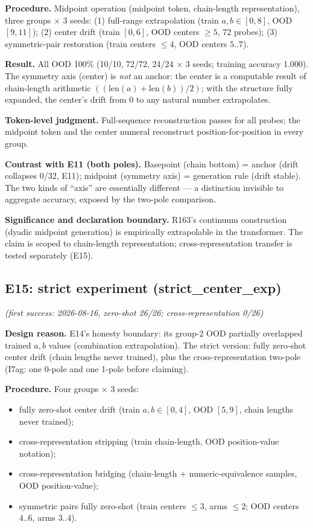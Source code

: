\documentclass[sigplan,10pt,anonymous,review]{acmart}
\begin{document}
\textbf{Procedure.} Midpoint operation (midpoint token, chain-length
representation), three groups $\times$ 3 seeds: (1) full-range
extrapolation (train $a,b\in[0,8]$, OOD $[9,11]$); (2) center drift (train
$[0,6]$, OOD centers $\ge 5$, 72 probes); (3) symmetric-pair restoration
(train centers $\le 4$, OOD centers $5..7$).

\textbf{Result.} All OOD 100\% (10/10, 72/72, 24/24 $\times$ 3 seeds;
training accuracy 1.000). The symmetry axis (center) is \emph{not} an
anchor: the center is a computable result of chain-length arithmetic
$((\mathrm{len}(a)+\mathrm{len}(b))/2)$; with the structure fully expanded,
the center's drift from 0 to any natural number extrapolates.

\textbf{Token-level judgment.} Full-sequence reconstruction passes for all
probes; the midpoint token and the center numeral reconstruct
position-for-position in every group.

\textbf{Contrast with E11 (both poles).} Basepoint (chain bottom) = anchor
(drift collapses 0/32, E11); midpoint (symmetry axis) = generation rule
(drift stable). The two kinds of ``axis'' are essentially different --- a
distinction invisible to aggregate accuracy, exposed by the two-pole
comparison.

\textbf{Significance and declaration boundary.} R163's continuum
construction (dyadic midpoint generation) is empirically extrapolable in
the transformer. The claim is scoped to chain-length representation;
cross-representation transfer is tested separately (E15).

\subsection{E15: strict experiment (strict\_center\_exp)}\hfill\textit{(first success: 2026-08-16, zero-shot 26/26; cross-representation 0/26)}

\textbf{Design reason.} E14's honesty boundary: its group-2 OOD partially
overlapped trained $a,b$ values (combination extrapolation). The strict
version: fully zero-shot center drift (chain lengths never trained), plus
the cross-representation two-pole (I7ag: one 0-pole and one 1-pole before
claiming).

\textbf{Procedure.} Four groups $\times$ 3 seeds:
\begin{itemize}
\item[1] fully zero-shot center drift (train $a,b\in[0,4]$, OOD $[5,9]$,
chain lengths never trained);
\item[2] cross-representation stripping (train chain-length, OOD
position-value notation);
\item[3] cross-representation bridging (chain-length + numeric-equivalence
samples, OOD position-value);
\item[4] symmetric pairs fully zero-shot (train centers $\le 3$, arms
$\le 2$; OOD centers $4..6$, arms $3..4$).
\end{itemize}
\end{document}
